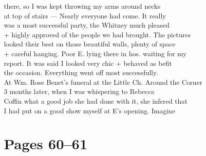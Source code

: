\documentclass[11pt,a4paper]{article}
\begin{document}
{there, so I was kept throwing my arms around necks \\
at top of stairs --- Nearly everyone had come. It really \\
was a most successful party, the Whitney much pleased \\
+ highly approved of the people we had brought. The pictures \\
looked their best on those beautiful walls, plenty of space \\
+ careful hanging. Poor E. lying there in hos. waiting for my \\
report. It was said I looked very chic + behaved as befit \\
the occasion. Everything went off most successfully. \\
\quad At Wm. Rose Benet's funeral at the Little Ch. Around the Corner \\
 3 months later, when I was whispering to Rebecca \\
Coffin what a good job she had done with it, she infered that \\
I had put on a good show myself at E's opening. Imagine}







\section{Pages 60--61}
\end{document}
